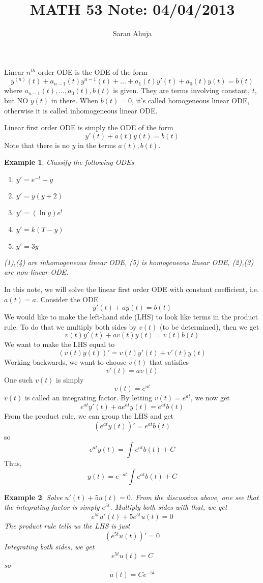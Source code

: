 \documentclass[10pt]{amsart}
\title{MATH 53 Note: 04/04/2013}
\author{Saran Ahuja}
\newtheorem{example}{Example}
\begin{document}
\maketitle

\noindent Linear $n^{th}$ order ODE is the ODE of the form 
$$ y^{(n)}(t)  + a_{n-1}(t)y^{n-1}(t) + \dots + a_{1}(t)y'(t) + a_{0}(t)y(t) = b(t) $$
where $a_{n-1}(t),\dots,a_{0}(t),b(t)$ is given. They are terms involving constant, $t$, but NO $y(t)$ in there. When $b(t) = 0$, it's called homogeneous linear ODE, otherwise it is called inhomogeneous linear ODE.

Linear first order ODE is simply the ODE of the form
$$ y'(t) + a(t)y(t) = b(t) $$
Note that there is no $y$ in the terms $a(t),b(t)$. 
 
\begin{example} Classify the following ODEs
\begin{enumerate}
	\item $y' = e^{-t} + y$
	\item $y' = y(y+2)$
	\item $y' = (\ln y) e^{t}$
	\item $y' = k(T-y)$ 
	\item $y' = 3y$ 
\end{enumerate}
(1),(4) are inhomogeneous linear ODE, (5) is homogeneous linear ODE, (2),(3) are non-linear ODE.
\end{example}

In this note, we will solve the linear first order ODE with constant coefficient, i.e. $a(t) = a$.  Consider the ODE
$$ y'(t) + ay(t) = b(t) $$
We would like to make the left-hand side (LHS) to look like terms in the product rule. To do that we multiply both sides by $v(t)$ (to be determined), then we get
$$ v(t) y'(t) + av(t) y(t) = v(t) b(t) $$
We want to make the LHS equal to
$$ (v(t)y(t))' = v(t)y'(t) + v'(t)y(t) $$
Working backwards, we want to choose $v(t)$ that satisfies
$$ v'(t) = av(t)  $$
One such $v(t)$ is simply
$$ v(t) = e^{at} $$
$v(t)$ is called an integrating factor. By letting $v(t) = e^{at}$, we now get
$$ e^{at}y'(t) +a e^{at}y(t) = e^{at}b(t) $$
From the product rule, we can group the LHS and get 
$$ (e^{at}y(t))' = e^{at}b(t) $$
so
$$ e^{at}y(t) = \int e^{at}b(t) + C $$
Thus,
$$ y(t) = e^{-at}\int e^{at}b(t) + C $$

\begin{example} Solve $u'(t) + 5u(t) = 0$. From the discussion above, one see that the integrating factor is simply $e^{5t}$. Multiply both sides with that, we get
$$ e^{5t}u'(t) + 5e^{5t}u(t) = 0 $$
The product rule tells us the LHS is just
$$ (e^{5t}u(t))' = 0 $$
Integrating both sides, we get
$$ e^{5t}u(t) = C $$
so 
$$ u(t) = Ce^{-5t} $$
\end{example}
\end{document}
